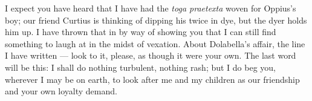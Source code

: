  I expect you have heard that I have had the \textit{toga praetexta} woven for Oppius's boy; our friend Curtius is thinking of dipping his twice in dye, but the dyer holds him up. I have thrown that in by way of showing you that I can still find something to laugh at in the midst of vexation. About Dolabella's affair, the line I have written --- look to it, please, as though it were your own. The last word will be this: I shall do nothing turbulent, nothing rash; but I do beg you, wherever I may be on earth, to look after me and my children as our friendship and your own loyalty demand.

